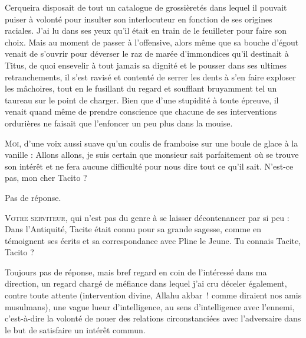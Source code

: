 \label{rat:12}%
Cerqueira disposait de tout un catalogue de grossièretés dans lequel il pouvait puiser à volonté pour insulter son interlocuteur en fonction de ses origines raciales. J’ai lu dans ses yeux qu’il était en train de le feuilleter pour faire son choix. Mais au moment de passer à l’offensive, alors même que sa bouche d’égout venait de s’ouvrir pour déverser le raz de marée d’immondices qu’il destinait à Titus, de quoi ensevelir à tout jamais sa dignité et le pousser dans ses ultimes retranchements, il s’est ravisé et contenté de serrer les dents à s’en faire exploser les mâchoires, tout en le fusillant du regard et soufflant bruyamment tel un taureau sur le point de charger. Bien que d’une stupidité à toute épreuve, il venait quand même de prendre conscience que chacune de ses interventions ordurières ne faisait que l’enfoncer un peu plus dans la mouise.

\begin{dialogue}

\textsc{Moi}, d’une voix aussi suave qu’un coulis de framboise sur une boule de glace à la vanille : Allons allons, je suis certain que monsieur sait parfaitement où se trouve son intérêt et ne fera aucune difficulté pour nous dire tout ce qu’il sait. N’est-ce pas, mon cher Tacito ?

Pas de réponse.

\textsc{Votre serviteur}, qui n’est pas du genre à se laisser décontenancer par si peu : Dans l’Antiquité, Tacite était connu pour sa grande sagesse, comme en témoignent ses écrits et sa correspondance avec Pline le Jeune. Tu connais Tacite, Tacito ?

\end{dialogue}

Toujours pas de réponse, mais bref regard en coin de l’intéressé dans ma direction, un regard chargé de méfiance dans lequel j’ai cru déceler également, contre toute attente (intervention divine, Allahu akbar~! comme diraient nos amis musulmans), une vague lueur d’intelligence, au sens d’intelligence avec l’ennemi, c’est-à-dire la volonté de nouer des relations circonstanciées avec l’adversaire dans le but de satisfaire un intérêt commun.

